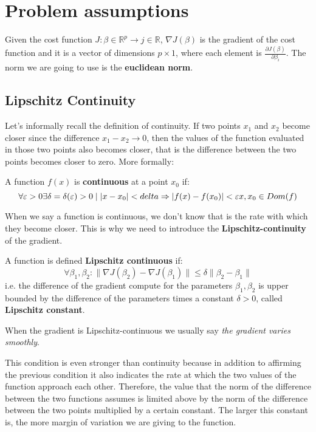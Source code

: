 \section{Problem assumptions}
\begin{remark}
    Given the cost function $J: \beta \in \mathbb{R}^{p} \to  j \in \mathbb{R}$, $\nabla J(\beta)$ is the gradient of the cost function and it is a vector of dimensions $p \times 1$, where each element is $\frac{\partial J(\beta)}{\partial \beta_i}$. The norm we are going to use is the \textbf{euclidean norm}.
\end{remark}

\subsection{Lipschitz Continuity}
Let's informally recall the definition of continuity. If two points $x_1$ and $x_2$ become closer since the difference $x_1 - x_2 \to 0$, then the values of the function evaluated in those two points also becomes closer, that is the difference between the two points becomes closer to zero.
More formally:
\begin{definition}
    A function $f(x)$ is \textbf{continuous} at a point $x_0$ if:    
    \[
        \forall \epsilon > 0\exists \delta=\delta(\epsilon) > 0\;|\;|x-x_0| < delta\implies |f(x)-f(x_0)| < \epsilon\\
        x,x_0\in Dom(f) 
    \]
\end{definition}

When we say a function is continuous, we don't know that is the rate with which they become closer. This is why we need to introduce the \textbf{Lipschitz-continuity} of the gradient.

\begin{definition}
    A function is defined \textbf{Lipschitz continuous} if:
    \[
        \forall \beta_1, \beta_2 \colon \| \nabla J(\beta_2) - \nabla J(\beta_1)\| \leq \delta \|\beta_2 - \beta_1\|
    \]
    i.e. the difference of the gradient compute for the parameters $\beta_1, \beta_2$ is upper bounded by the difference of the parameters times a constant $\delta > 0$, called \textbf{Lipschitz constant}.
\end{definition}

When the gradient is Lipschitz-continuous we usually say \textit{the gradient varies smoothly}.

This condition is even stronger than continuity because in addition to affirming the previous condition it also indicates the rate at which the two values of the function approach each other.
Therefore, the value that the norm of the difference between the two functions assumes is limited above by the norm of the difference between the two points multiplied by a certain constant. 
The larger this constant is, the more margin of variation we are giving to the function.

